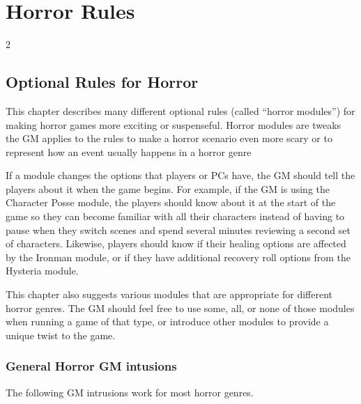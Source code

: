 \part{Horror Rules}

\begin{multicols}{2}

\chapter{Optional Rules for Horror}

This chapter describes many different optional rules (called “horror modules”) for making horror games more exciting or suspenseful. Horror modules are tweaks the GM applies to the rules to make a horror scenario even more scary or to represent how
an event usually happens in a horror genre

If a module changes the options that players or PCs have, the GM should tell the players about it when the game begins. For example, if the GM is using the Character Posse module, the players should know about it at the start of the game so they can become familiar with all their characters instead of having to pause when they switch scenes and spend several minutes reviewing a second set of characters. Likewise, players should know if their healing options are affected by the Ironman module, or if they have additional recovery roll options from the Hysteria module.

This chapter also suggests various modules that are appropriate for different horror genres. The GM should feel free to use some, all, or none of those modules when running a game of that type, or introduce other modules to provide a unique twist to the game.

\section{General Horror GM intusions}

The following GM intrusions work for most horror genres.


\end{multicols}
